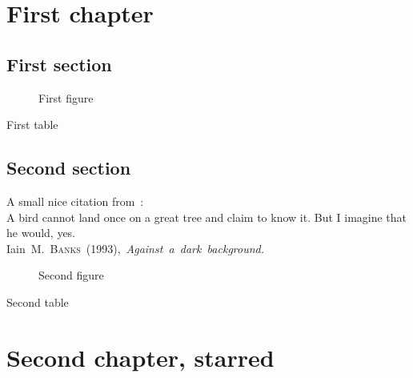 \documentclass[12pt,a4paper]{report}
\begin{document}
\dominitoc \dominilof \dominilot
\tableofcontents \mtcaddchapter
\listoffigures \mtcaddchapter
\listoftables \mtcaddchapter
\chapter{First chapter}
\minitoc \mtcskip
\minilof \mtcskip
\minilot
\section{First section}

\begin{figure}[tp] \caption{First figure} \end{figure}
\begin{table}[tp] \caption{First table} \end{table}

\section{Second section}
A small nice citation from~\cite{dark}:\\
%
%
%
%
%
%
\textsf{A bird cannot land once on a great tree and claim to know it.
But I imagine that he would, yes.}\\
\hbox{}\hfill
Iain~M.~\textsc{Banks}~(1993),~\textsl{Against~a~dark~background.}%

\begin{figure}[tp] \caption{Second figure} \end{figure}
\begin{table} \caption{Second table} \end{table}
\chapter*{Second chapter, starred}
\end{document}
